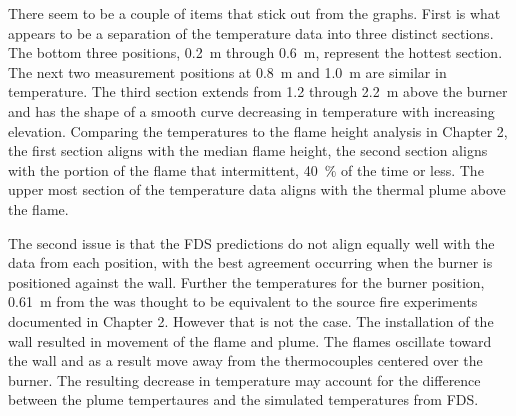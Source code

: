 \documentclass[twoside]{uocthesis}
\begin{document}
{ There seem to be a couple of items that stick out from the graphs.  First is what appears to be a separation of the temperature data into three distinct sections.  The bottom three positions, 0.2~m through 0.6~m, represent the hottest section.  The next two measurement positions at 0.8~m and 1.0~m are similar in temperature.  The third section extends from 1.2 through 2.2~m above the burner and has the shape of a smooth curve decreasing in temperature with increasing elevation.  Comparing the temperatures to the flame height analysis in Chapter 2, the first section aligns with the median flame height, the second section aligns with the portion of the flame that intermittent, 40~$\%$ of the time or less.  The upper most section of the temperature data aligns with the thermal plume above the flame.  

 The second issue is that the FDS predictions do not align equally well with the data from each position, with the best agreement occurring when the burner is positioned against the wall.  Further the temperatures for the burner position, 0.61~m from the was thought to be equivalent to the source fire experiments documented in Chapter 2. However that is not the case.  The installation of the wall resulted in movement of the flame and plume.  The flames oscillate toward the wall and as a result move away from the thermocouples centered over the burner. The resulting decrease in temperature may account for the difference between the plume tempertaures and the simulated temperatures from FDS.                     

}
\end{document}
